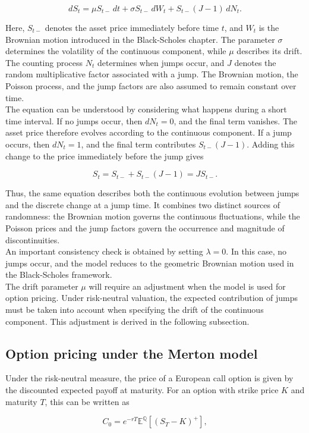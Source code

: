 \documentclass{article}
\begin{document}
	\[
	dS_t = \mu S_{t-}\,dt + \sigma S_{t-}\,dW_t + S_{t-}(J-1)\,dN_t.
	\]
	
	Here, $S_{t-}$ denotes the asset price immediately before time $t$, and $W_t$ is the Brownian motion introduced in the Black-Scholes chapter. The parameter $\sigma$ determines the volatility of the continuous component, while $\mu$ describes its drift. The counting process $N_t$ determines when jumps occur, and $J$ denotes the random multiplicative factor associated with a jump. The Brownian motion, the Poisson process, and the jump factors are also assumed to remain constant over time.\\
	The equation can be understood by considering what happens during a short time interval. If no jumps occur, then $dN_t=0$, and the final term vanishes. The asset price therefore evolves according to the continuous component. If a jump occurs, then $dN_t=1$, and the final term contributes $S_{t-}(J-1)$. Adding this change to the price immediately before the jump gives
	
	\[
	S_t = S_{t-}+S_{t-}(J-1) = JS_{t-}.
	\]
	
	
	Thus, the same equation describes both the continuous evolution between jumps and the discrete change at a jump time. It combines two distinct sources of randomness: the Brownian motion governs the continuous fluctuations, while the Poisson prices and the jump factors govern the occurrence and magnitude of discontinuities.\\
	An important consistency check is obtained by setting $\lambda=0$. In this case, no jumps occur, and the model reduces to the geometric Brownian motion used in the Black-Scholes framework.\\
	The drift parameter $\mu$ will require an adjustment when the model is used for option pricing. Under risk-neutral valuation, the expected contribution of jumps must be taken into account when specifying the drift of the continuous component. This adjustment is derived in the following subsection.
	
	\subsection{Option pricing under the Merton model}
	
	Under the risk-neutral measure, the price of a European call option is given by the discounted expected payoff at maturity. For an option with strike price $K$ and maturity $T$, this can be written as
	
	\[
	C_0
	=
	e^{-rT}
	\mathbb{E}^{\mathbb{Q}}
	\left[(S_T-K)^+\right],
	\]
	
\end{document}
